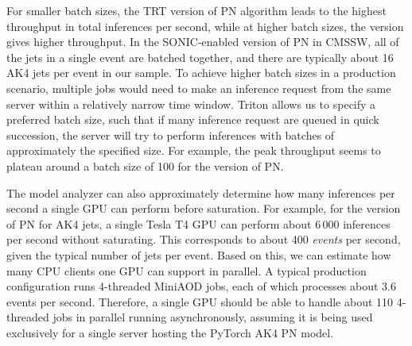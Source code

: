 For smaller batch sizes, the TRT version of PN algorithm leads to the highest throughput in total inferences per second, while at higher batch sizes, the \PYTORCH version gives higher throughput. In the SONIC-enabled version of PN in CMSSW, all of the jets in a single event are batched together, and there are typically about 16 AK4 jets per event in our \ttbar sample. To achieve higher batch sizes in a production scenario, multiple jobs would need to make an inference request from the same server within a relatively narrow time window. Triton allows us to specify a preferred batch size, such that if many inference request are queued in quick succession, the server will try to perform inferences with batches of approximately the specified size. For example, the peak throughput seems to plateau around a batch size of 100 for the \PYTORCH version of PN.%

The model analyzer can also approximately determine how many inferences per second a single GPU can perform before saturation. For example, for the \PYTORCH version of PN for AK4 jets, a single Tesla T4 GPU can perform about 6\,000 inferences per second without saturating. This corresponds to about 400 \textit{events} per second, given the typical number of jets per event.
Based on this, we can estimate how many CPU clients one GPU can support in parallel. A typical production configuration runs 4-threaded MiniAOD jobs, each of which processes about 3.6 events per second. Therefore, a single GPU should be able to handle about 110 4-threaded jobs in parallel running asynchronously, assuming it is being used exclusively for a single server hosting the PyTorch AK4 PN model.

